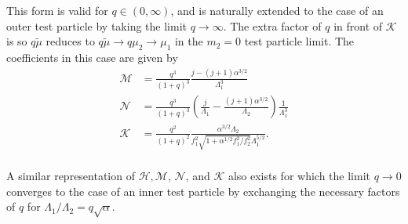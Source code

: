 \documentclass[usenatbib,twocolumn]{mnras}
\begin{document}
\noindent This form is valid for \(q\in (0,\infty)\), and is
naturally extended to the case of an outer test particle by taking the
limit \(q\to\infty\).  The extra factor of \(q\) in front of \(\mathcal K\)
is so \(q\tilde\mu\) reduces to \(q\tilde\mu\to q\mu_2 \to \mu_1\) in the
\(m_2=0\) test particle limit.  The coefficients in this case are given
by
\begin{align}
  \mathcal M
  &= \frac{q^3}{(1+q)^3}\frac{j-(j+1)\alpha^{3/2}}{\Lambda_1^3}\\
  \mathcal N
  &= \frac{q^3}{(1+q)^3}\left(
    \frac{j}{\Lambda_1} - \frac{(j+1)\alpha^{3/2}}{\Lambda_2}
    \right)\frac{1}{\Lambda_1^3}\\
  \mathcal K
  &= \frac{q^2}{(1+q)^2}
    \frac{\alpha^{3/2}\Lambda_2}{f_1^2\sqrt{1+\alpha^{1/2}f_1^2/f_2^2}\Lambda_1^{5/2}}.\\
\end{align}

A similar representation of \(\mathcal H, \mathcal M\), \(\mathcal N\),
and \(\mathcal{K}\) also exists for which the limit \(q\to 0\) converges
to the case of an inner test particle by exchanging the necessary
factors of \(q\) for \(\Lambda_1/\Lambda_2 = q\sqrt\alpha\).
\end{document}
